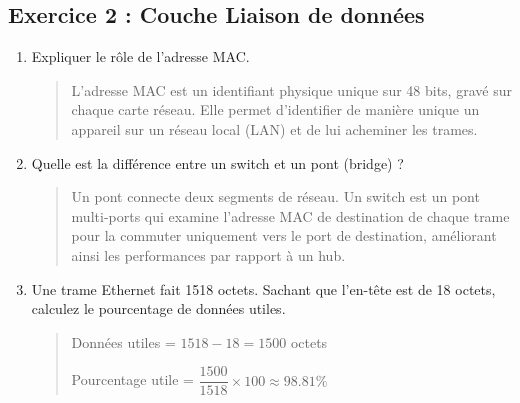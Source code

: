 \documentclass[a4paper,12pt]{article}
\begin{document}
\subsection*{Exercice 2 : Couche Liaison de données}
\begin{enumerate}
    \item Expliquer le rôle de l'adresse MAC.
    \begin{quote}
        L'adresse MAC est un identifiant physique unique sur 48 bits, gravé sur chaque carte réseau. Elle permet d'identifier de manière unique un appareil sur un réseau local (LAN) et de lui acheminer les trames.
    \end{quote}

    \item Quelle est la différence entre un switch et un pont (bridge) ?
    \begin{quote}
        Un pont connecte deux segments de réseau. Un switch est un pont multi-ports qui examine l'adresse MAC de destination de chaque trame pour la commuter uniquement vers le port de destination, améliorant ainsi les performances par rapport à un hub.
    \end{quote}

    \item Une trame Ethernet fait 1518 octets. Sachant que l'en-tête est de 18 octets, calculez le pourcentage de données utiles.
    \begin{quote}
        Données utiles = $1518 - 18 = 1500$ octets

        Pourcentage utile = $\dfrac{1500}{1518} \times 100 \approx 98.81\%$
    \end{quote}
\end{enumerate}
\end{document}
